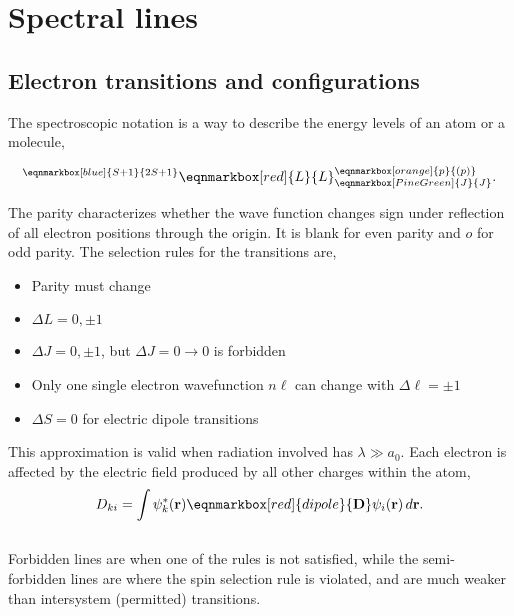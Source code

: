 \chapter{Spectral lines}
\section{Electron transitions and configurations}
The spectroscopic notation is a way to describe the energy levels of an atom or a molecule,
\begin{definition}
\begin{equation}
  ^{\eqnmarkbox[blue]{S+1}{2S+1}}\eqnmarkbox[red]{L}{L}_{\eqnmarkbox[PineGreen]{J}{J}}^{\eqnmarkbox[orange]{p}{(p)}}.
\end{equation}
\end{definition}
The parity characterizes whether the wave function changes sign under reflection of all electron positions through the origin. It is blank for even parity and $o$ for odd parity. The selection rules for the transitions are, 
\begin{itemize}
  \item Parity must change 
  \item $\Delta L = 0, \pm 1$ 
  \item $\Delta J = 0, \pm 1$, but $\Delta J = 0\rightarrow 0$ is forbidden
  \item Only one single electron wavefunction $n\ell$ can change with $\Delta\ell = \pm 1$ 
  \item $\Delta S = 0$ for electric dipole transitions
\end{itemize} 
This approximation is valid when radiation involved has $\lambda\gg a_0$.
Each electron is affected by the electric field produced by all other charges within the atom, 
\begin{equation}
  D_{ki} = \int \psi^*_k(\mathbf{r})\eqnmarkbox[red]{dipole}{\mathbf{D}}\psi_i(\mathbf{r})\,d\mathbf{r}.
\end{equation}
\\

\vspace{-5mm}
\textsf{Forbidden lines} are when one of the rules is not satisfied, while the \textsf{semi-forbidden lines} are where the spin selection rule is violated, and are much weaker than intersystem (permitted) transitions.
